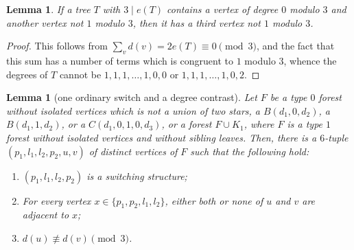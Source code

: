 \documentclass[11pt]{article}
\newtheorem{lemma}[theorem]{Lemma}
\begin{document}
\begin{lemma}\label{lem:thirdvertex}
    If a tree $T$ with $3 \mid e(T)$ contains a vertex of degree $0$ modulo $3$ and another vertex not $1$ modulo $3$, then it has a third vertex not $1$ modulo $3$.
\end{lemma}

\begin{proof}
    This follows from $\sum_{v}d(v) = 2e(T) \equiv 0 \pmod 3$, and the fact that this sum has a number of terms which is congruent to $1$ modulo $3$, whence the degrees of $T$ cannot be $1, 1, 1, \dots, 1, 0, 0$ or $1,1,1,\dots,1,0,2$.
\end{proof}


\begin{lemma}[one ordinary switch and a degree contrast]\label{lem:degree-contrast}\label{lem:6vertices}
Let $F$ be a type $0$ forest without isolated vertices which is not a union of two stars, a $B(d_1,0,d_2)$, a $B(d_1,1,d_2)$, or a $C(d_1,0,1,0,d_3)$, or a forest $F \cup K_1$, where $F$ is a type $1$ forest without isolated vertices and without sibling leaves. Then, there is a $6$-tuple  $(p_1, l_1, l_2, p_2, u, v)$ of distinct vertices of $F$ such that the following hold:

\begin{enumerate}[label=\roman*)]
    \item $(p_1,l_1,l_2,p_2)$ is a switching structure;

    \item For every vertex $x \in \{p_1, p_2, l_1, l_2\}$, either both or none of $u$ and $v$ are adjacent to $x$;

    \item $d(u) \not\equiv d(v) \pmod 3$.
    
\end{enumerate}
\end{lemma}
\end{document}
